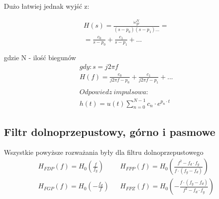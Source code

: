        \noindent Dużo łatwiej jednak wyjść z:
        \begin{multicols}{2}
            \noindent
            \begin{gather*}
                H(s) = \frac{\omega_{gr}^N}{(s-p_0)(s-p_1)...} =\\ = \frac{c_0}{s-p_0} + \frac{c_1}{s-p_1}+...\\\\
            \end{gather*}
            gdzie N - ilość biegunów
            \begin{gather*}
                gdy: s = j2\pi f\\
                H(f) = \frac{c_0}{j2\pi f - p_0} + \frac{c_1}{j2\pi f -p_1}+...\\\\
                Odpowiedz\ impulsowa:\\
                h(t) = u(t) \sum\limits_{n = 0}^{N-1}c_n\cdot e^{p_n\cdot t}
            \end{gather*}

            \noindent
            \begin{center}
            \end{center}
        \end{multicols}

        \subsection{Filtr dolnoprzepustowy, górno i pasmowe}
            Wszystkie powyższe rozważania były dla filtru dolnoprzepustowego
            \begin{align*}
                H_{FDP}(f) = H_0\left(\frac{f}{f_g}\right) && H_{FPP}(f)=H_0\left(\frac{f^2-f_d\cdot f_g}{f\cdot(f_g-f_d)}\right)\\
                H_{FGP}(f) = H_0\left(-\frac{f_d}{f}\right)&& H_{FPZ}(f)=H_0\left(-\frac{f\cdot(f_g-f_d)}{f^2-f_d\cdot f_g}\right)
            \end{align*}

